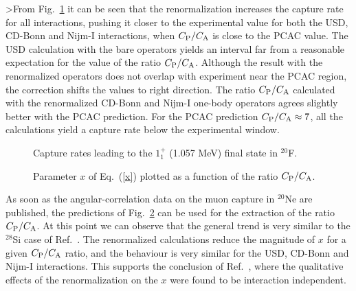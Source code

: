 \documentclass[12pt]{iopart}
\begin{document}
>From Fig.\ \ref{rates} it can be seen that the renormalization increases the
capture rate for all interactions, pushing it
closer to the experimental value for both the USD, CD-Bonn and Nijm-I
interactions, when $C_{\rm P}/C_{\rm A}$ is close to the PCAC value.
The USD
calculation with the bare operators yields an interval far from a reasonable
expectation for the value of the ratio $C_{\rm P}/C_{\rm A}$. Although the
result with the renormalized operators does not overlap with experiment near
the PCAC region, the correction shifts the values to right direction.
The ratio $C_{\rm P}/C_{\rm A}$ calculated with the renormalized CD-Bonn and
Nijm-I one-body operators agrees slightly better
with the PCAC prediction. For the PCAC prediction $C_{\rm P}/C_{\rm A}\approx7$,
all the calculations yield a capture rate below the experimental
window.
\begin{figure}
       \begin{center}
        \caption{Capture rates leading to the $1^+_1$ (1.057 MeV) final state
        in $^{20}$F.}
        \label{rates}
     \end{center}
\end{figure}

\begin{figure}
       \begin{center}
        \caption{Parameter $x$ of Eq.\ (\protect\ref{x}) plotted as a function of
        the ratio $C_{\rm P}/C_{\rm A}$.}
        \label{xfig}
        \end{center}
\end{figure}
As soon as the angular-correlation data on the muon
capture in $^{20}$Ne are published, the predictions of Fig.\ \ref{xfig} can
be used for the extraction of the ratio $C_{\rm P}/C_{\rm A}$. At this point
we can observe that the general trend is very similar to the $^{28}$Si case
of Ref.\ \cite{sii99}. The renormalized calculations reduce the magnitude of
$x$ for a given $C_{\rm P}/C_{\rm A}$ ratio, and the
behaviour is very similar for the USD, CD-Bonn \cite{mac96} and Nijm-I \cite{nim94}
interactions. This supports
the conclusion of Ref.\ \cite{sii99}, where the qualitative effects of the
renormalization on the $x$ were found to be interaction independent.
\end{document}

